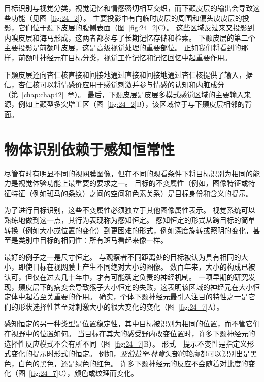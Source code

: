 目标识别与视觉分类，视觉记忆和情感密切相互交织，而下颞皮层的输出会导致这些功能（见图~\ref{fig:24_2}）。
主要投影中有向临时皮层的周围和偏头皮皮层的投影，它们位于颞下皮层的腹侧表面（图~\ref{fig:24_2}C）。
这些区域反过来又投影到内嗅皮层和海马形成，这两者都参与了长期记忆存储和检索。
下颞皮层的第二个主要投影是前额叶皮层，这是高级视觉处理的重要部位。
正如我们将看到的那样，前额叶神经元在目标分类，视觉工作记忆和记忆回忆中起重要作用。


下颞皮层还向杏仁核直接和间接地通过直接和间接地通过杏仁核提供了输入，据信，杏仁核可以将情感价应用于感觉刺激并参与情感的认知和内脏成分（第~\ref{chap:chap42}~章）。
最后，下颞皮层是皮层多模式感觉区域的主要输入来源，例如上颞型多突增工区（图~\ref{fig:24_2}B），该区域位于与下颞皮层相邻的背面。



\section{物体识别依赖于感知恒常性}

尽管有时有明显不同的视网膜图像，但在不同的观看条件下将目标识别为相同的能力是视觉体验功能上最重要的要求之一。
目标的不变属性（例如，图像特征或特征特征（例如斑马的条纹）之间的空间和色素关系）是目标身份和含义的提示。


为了进行目标识别，这些不变属性必须独立于其他图像属性表示。
视觉系统可以熟练地做到这一点，其行为表现称为感知恒定。
感知恒定的形式从跨目标的简单转换（例如大小或位置的变化）到更困难的形式，例如深度旋转或照明的变化，甚至是类别中目标的相同性：所有斑马看起来像一样。


最好的例子之一是尺寸恒定。
与观察者不同距离处的目标被认为具有相同的大小，即使目标在视网膜上产生不同绝对大小的图像。
数百年来，大小的构成已被认可，但仅在过去几十年中，才有可能确定负责的神经机制。
一项早期的研究发现，颞皮层下的病变会导致猴子大小恒定的失败，这表明该区域的神经元在大小恒定体中起着至关重要的作用。
确实，个体下颞神经元最引人注目的特性之一是它们的形状选择性甚至对刺激大小的很大变化的变化（图~\ref{fig:24_7}A）。


感知恒定的另一种类型是位置稳定性，其中目标被识别为相同的位置，而不管它们在视野中的位置如何。
当目标在其大的感受野内改变位置时，许多下颞神经元的选择性反应模式不会有所不同（图~\ref{fig:24_7}B）。
形式 - 提示不变性是指定义形式变化的提示时形式的恒定。
例如，\textit{亚伯拉罕$\cdot$林肯}头部的轮廓都可以识别出是黑色，白色的黑色，还是绿色的红色。 
许多下颞神经元的反应不会随着对比度的变化（图~\ref{fig:24_7}C），颜色或纹理而变化。


